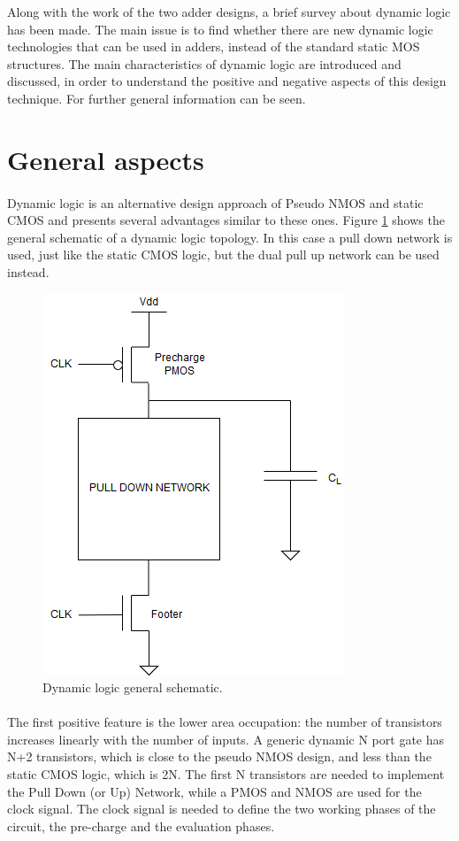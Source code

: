 

Along with the work of the two adder designs, a brief survey about dynamic logic has been made. The main issue is to find whether there are new dynamic logic technologies that can be used in adders, instead of the standard static MOS structures. The main characteristics of dynamic logic are introduced and discussed, in order to understand the positive and negative aspects of this design technique. For further general information \cite{Rabaey} can be seen.

\section{General aspects}

\paragraph{} Dynamic logic is an alternative design approach of Pseudo NMOS and static CMOS and presents several advantages similar to these ones. Figure \ref{fig:dynamic} shows the general schematic of a dynamic logic topology. In this case a pull down network is used, just like the static CMOS logic, but the dual pull up network can be used instead.

\begin{figure}[H]
\centering
\includegraphics[width = 7 cm]{dinamic_logic_survey/Dynamic_logic-Page-1.png}
\caption{Dynamic logic general schematic.}
\label{fig:dynamic}
\end{figure}

\paragraph{} The first positive feature is the lower area occupation: the number of transistors increases linearly with the number of inputs. A generic dynamic N port gate has N+2 transistors, which is close to the pseudo NMOS design, and less than the static CMOS logic, which is 2N. The first N transistors are needed to implement the Pull Down (or Up) Network, while a PMOS and NMOS are used for the clock signal. The clock signal is needed to define the two working phases of the circuit, the pre-charge and the evaluation phases.

